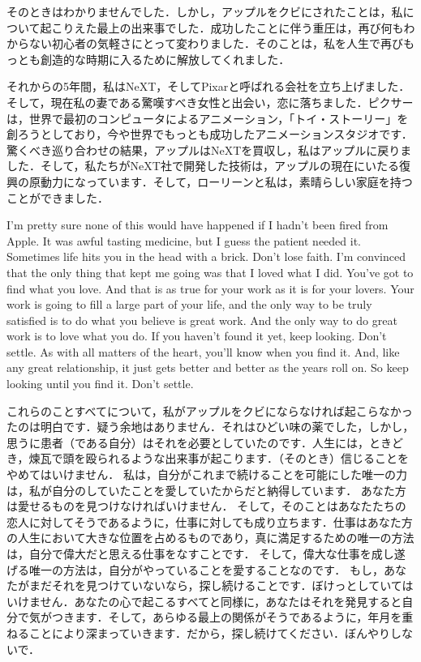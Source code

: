 \documentclass[twocolumn]{jsarticle}
\begin{document}
\newpage

そのときはわかりませんでした．しかし，アップルをクビにされたことは，私について起こりえた最上の出来事でした．成功したことに伴う重圧は，再び何もわからない初心者の気軽さにとって変わりました．そのことは，私を人生で再びもっとも創造的な時期に入るために解放してくれました．

\vspace{\baselineskip}

それからの5年間，私はNeXT，そしてPixarと呼ばれる会社を立ち上げました．そして，現在私の妻である驚嘆すべき女性と出会い，恋に落ちました．ピクサーは，世界で最初のコンピュータによるアニメーション，「トイ・ストーリー」を創ろうとしており，今や世界でもっとも成功したアニメーションスタジオです．驚くべき巡り合わせの結果，アップルはNeXTを買収し，私はアップルに戻りました．そして，私たちがNeXT社で開発した技術は，アップルの現在にいたる復興の原動力になっています．そして，ローリーンと私は，素晴らしい家庭を持つことができました．

\newpage

I'm pretty sure none of this would have happened if I hadn't been fired from Apple. It was awful tasting medicine, but I guess the patient needed it. Sometimes life hits you in the head with a brick. Don't lose faith. I'm convinced that the only thing that kept me going was that I loved what I did. You've got to find what you love. And that is as true for your work as it is for your lovers. Your work is going to fill a large part of your life, and the only way to be truly satisfied is to do what you believe is great work. And the only way to do great work is to love what you do. If you haven't found it yet, keep looking. Don't settle. As with all matters of the heart, you'll know when you find it. And, like any great relationship, it just gets better and better as the years roll on. So keep looking until you find it. Don't settle.

\newpage

これらのことすべてについて，私がアップルをクビにならなければ起こらなかったのは明白です．疑う余地はありません．それはひどい味の薬でした，しかし，思うに患者（である自分）はそれを必要としていたのです．人生には，ときどき，煉瓦で頭を殴られるような出来事が起こります．（そのとき）信じることをやめてはいけません．
私は，自分がこれまで続けることを可能にした唯一の力は，私が自分のしていたことを愛していたからだと納得しています．
あなた方は愛せるものを見つけなければいけません．
そして，そのことはあなたたちの恋人に対してそうであるように，仕事に対しても成り立ちます．仕事はあなた方の人生において大きな位置を占めるものであり，真に満足するための唯一の方法は，自分で偉大だと思える仕事をなすことです．
そして，偉大な仕事を成し遂げる唯一の方法は，自分がやっていることを愛することなのです．
もし，あなたがまだそれを見つけていないなら，探し続けることです．ぼけっとしていてはいけません．あなたの心で起こるすべてと同様に，あなたはそれを発見すると自分で気がつきます．そして，あらゆる最上の関係がそうであるように，年月を重ねることにより深まっていきます．だから，探し続けてください．ぼんやりしないで．
\end{document}
